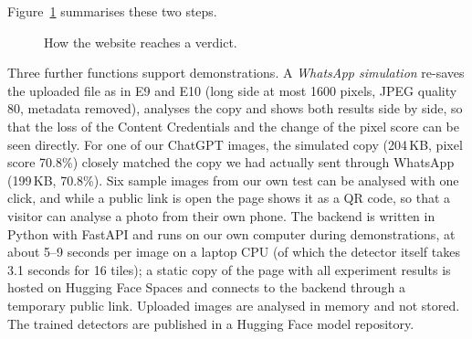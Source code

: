 \documentclass{mnnit}
\begin{document}
Figure~\ref{fig:flow-web} summarises these two steps.

\begin{figure}[htbp]
\centering
{}
\caption{How the website reaches a verdict.}
\label{fig:flow-web}
\end{figure}
Three further functions support demonstrations. A \emph{WhatsApp
simulation} re-saves the uploaded file as in E9 and E10 (long side at
most 1600 pixels, JPEG quality 80, metadata removed), analyses the copy
and shows both results side by side, so that the loss of the Content
Credentials and the change of the pixel score can be seen directly. For
one of our ChatGPT images, the simulated copy
(204\,KB, pixel score 70.8\%) closely matched the copy we had actually
sent through WhatsApp (199\,KB, 70.8\%). Six sample images from our own
test can be analysed with one click, and while a public link is open the
page shows it as a QR code, so that a visitor can analyse a photo from
their own phone.
The backend is written in Python with FastAPI and runs on our own
computer during demonstrations, at about 5--9 seconds per image on a
laptop CPU (of which the detector itself takes 3.1 seconds for 16 tiles); a static copy of the page with all experiment results is
hosted on Hugging Face Spaces and connects to the backend through a
temporary public link. Uploaded images are analysed in memory and not
stored. The trained detectors are published in a Hugging Face model
repository.
\end{document}
